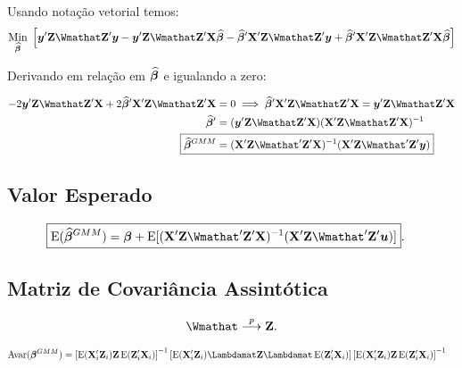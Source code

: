 \documentclass[11pt, oneside, a4paper, article]{article}
\numberwithin{equation}{section}
\begin{document}
\begin{description}
\noindent
Usando notação vetorial temos:
\begin{align*}
\underset{\betavechat}{\text{Min}} \;
\left[
\yvec' \Zmat \Wmathat \Zmat' \yvec -
\yvec' \Zmat \Wmathat \Zmat' \Xmat \betavechat -
\betavechat' \Xmat'  \Zmat \Wmathat \Zmat' \yvec +
\betavechat' \Xmat'  \Zmat \Wmathat \Zmat' \Xmat \betavechat
\right]
\end{align*}

Derivando em relação em $\widehat{\boldsymbol{\beta}}$ e igualando a zero:

\vspace{-1 em}
\begin{align*}
-2 \yvec' \Zmat \Wmathat \Zmat' \Xmat + 2 \betavechat'\Xmat' \Zmat \Wmathat \Zmat' \Xmat &= 0
\implies
\betavechat'\Xmat' \Zmat \Wmathat \Zmat' \Xmat = \yvec' \Zmat \Wmathat \Zmat' \Xmat 
\\
\betavechat' &= ( \yvec' \Zmat \Wmathat \Zmat' \Xmat ) ( \Xmat' \Zmat \Wmathat \Zmat' \Xmat )^{-1}
\\
\Aboxed{
\betavechat^{GMM} &= ( \Xmat' \Zmat \Wmathat' \Zmat' \Xmat )^{-1} ( \Xmat' \Zmat \Wmathat' \Zmat' \yvec ) }
\end{align*}

\subsection{Valor Esperado} 

\vspace{-1 em}
\begin{align*}
\Aboxed{
\E( \betavechat^{GMM} ) &=
\betavec +
\E[ ( \Xmat' \Zmat \Wmathat' \Zmat' \Xmat )^{-1} ( \Xmat' \Zmat \Wmathat' \Zmat' \uvec ) ] }.
\end{align*}

\subsection{Matriz de Covariância Assintótica} 

\begin{hypo}
\begin{align*}
	\Wmathat \arrowp \Wmat.
\end{align*}
\end{hypo}

\vspace{-2 em}
\begin{align*}
\Avar( \betavec^{GMM} ) &=
\left[ \E( \Xmat_{i}'\Zmat_{i}) \Wmat \, \E( \Zmat_{i}'\Xmat_{i}) \right]^{-1}
\left[ \E( \Xmat_{i}'\Zmat_{i}) \Lambdamat \Wmat \Lambdamat \, \E( \Zmat_{i}'\Xmat_{i}) \right]
\left[ \E( \Xmat_{i}'\Zmat_{i}) \Wmat \, \E( \Zmat_{i}'\Xmat_{i}) \right]^{-1}
\end{align*}


\end{description}
\end{document}
